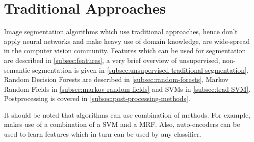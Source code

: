 
\section{Traditional Approaches}\label{sec:traditional-approaches}%
Image segmentation algorithms which use traditional approaches, hence don't
apply neural networks and make heavy use of domain knowledge, are wide-spread
in the computer vision community. Features which can be used for segmentation
are described in \cref{subsec:features}, a very brief overview of unsupervised,
non-semantic segmentation is given in
\cref{subsec:unsupervised-traditional-segmentation}, Random Decision
Forests are described in \cref{subsec:random-forests}, Markov Random Fields in \cref{subsec:markov-random-fields}
 and \glspl{SVM} in
\cref{subsec:trad-SVM}.
Postprocessing is covered in \cref{subsec:post-processing-methods}.

It should be noted that algorithms can use combination of methods. For example,
\cite{tighe2014scene} makes use of a combination of a \gls{SVM} and a
\gls{MRF}. Also, auto-encoders can be used to learn features which in turn
can be used by any classifier.







